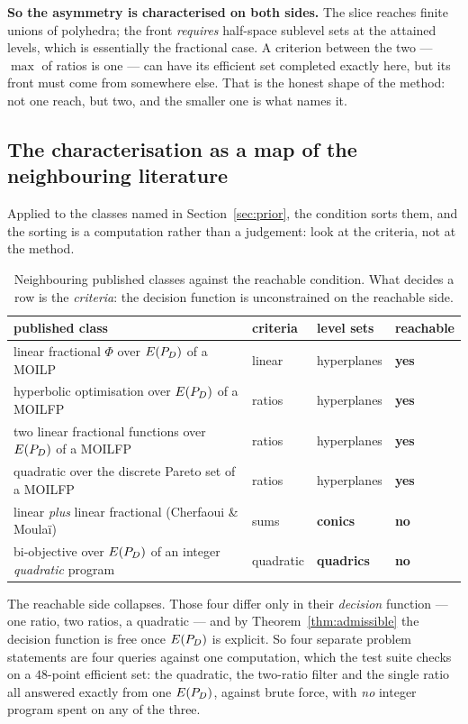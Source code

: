 \documentclass[11pt,a4paper]{article}
\begin{document}
\textbf{So the asymmetry is characterised on both sides.}  The slice reaches
finite unions of polyhedra; the front \emph{requires} half-space sublevel sets
at the attained levels, which is essentially the fractional case.  A criterion
between the two --- $\max$ of ratios is one --- can have its efficient set
completed exactly here, but its
front must come from somewhere else.  That is the honest shape of the method:
not one reach, but two, and the smaller one is what names it.

\subsection{The characterisation as a map of the neighbouring literature}
\label{sec:map}

Applied to the classes named in Section~\ref{sec:prior}, the condition sorts
them, and the sorting is a computation rather than a judgement: look at the
criteria, not at the method.

\begin{table}[h]
\centering
\caption{Neighbouring published classes against the reachable condition.  What
decides a row is the \emph{criteria}: the decision function is unconstrained on
the reachable side.}
\label{tab:map}
\small
\begin{tabular}{p{}p{}p{}l}
\toprule
published class & criteria & level sets & reachable \\
\midrule
linear fractional $\Phi$ over $E(P_{D})$ of a MOILP
  & linear & hyperplanes & \textbf{yes} \\
hyperbolic optimisation over $E(P_{D})$ of a MOILFP
  & ratios & hyperplanes & \textbf{yes} \\
two linear fractional functions over $E(P_{D})$ of a MOILFP
  & ratios & hyperplanes & \textbf{yes} \\
quadratic over the discrete Pareto set of a MOILFP
  & ratios & hyperplanes & \textbf{yes} \\
\midrule
linear \emph{plus} linear fractional (Cherfaoui \& Moula\"i)
  & sums & \textbf{conics} & \textbf{no} \\
bi-objective over $E(P_{D})$ of an integer \emph{quadratic} program
  & quadratic & \textbf{quadrics} & \textbf{no} \\
\bottomrule
\end{tabular}
\end{table}

\noindent
The reachable side collapses.  Those four differ only in their \emph{decision}
function --- one ratio, two ratios, a quadratic --- and by
Theorem~\ref{thm:admissible} the decision function is free once $E(P_{D})$ is
explicit.  So four separate problem statements are four queries against one
computation, which the test suite checks on a $48$-point efficient set: the
quadratic, the two-ratio filter and the single ratio all answered exactly from
one $E(P_{D})$, against brute force, with \emph{no} integer program spent on any of
the three.
\end{document}
